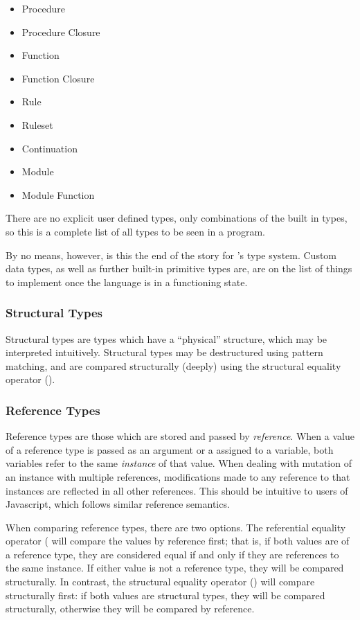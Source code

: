 \begin{itemize}
    \item Procedure
    \item Procedure Closure
    \item Function
    \item Function Closure
    \item Rule
    \item Ruleset
    \item Continuation
    \item Module
    \item Module Function
\end{itemize}

\noindent
There are no explicit user defined types, only combinations of the built in
types, so this is a complete list of all types to be seen in a \Trilogy{}
program.

By no means, however, is this the end of the story for \Trilogy{}'s type
system. Custom data types, as well as further built-in primitive types are,
are on the list of things to implement once the language is in a functioning
state.

\subsubsection{Structural Types}

Structural types are types which have a ``physical'' structure, which may be
interpreted intuitively. Structural types may be destructured using pattern
matching, and are compared structurally (deeply) using the structural equality
operator ().

\subsubsection{Reference Types}

Reference types are those which are stored and passed by \emph{reference}. When
a value of a reference type is passed as an argument or a assigned to a variable, both
variables refer to the same \emph{instance} of that value. When dealing with
mutation of an instance with multiple references, modifications made to any
reference to that instances are reflected in all other references. This should be
intuitive to users of Javascript, which follows similar reference semantics.

When comparing reference types, there are two options. The referential equality
operator (\op{==)} will compare the values by reference first; that is, if
both values are of a reference type, they are considered equal if and only
if they are references to the same instance. If either value is not a reference
type, they will be compared structurally. In contrast, the structural equality
operator () will compare structurally first: if both values are structural
types, they will be compared structurally, otherwise they will be compared by
reference.

